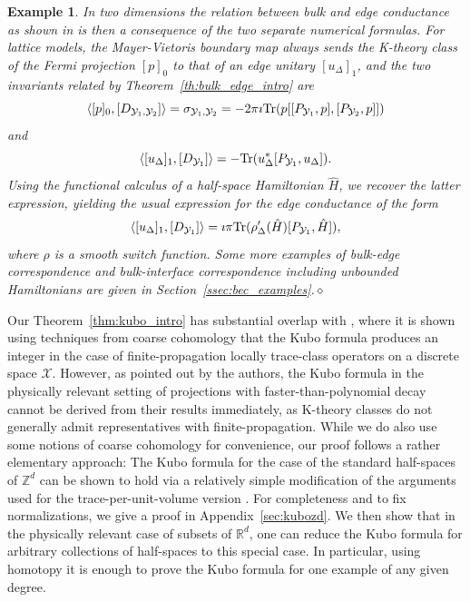 \documentclass[12pt]{amsart}
\newtheorem{example}[theorem]{Example}
\newcommand{\RM}{{\mathbb R}}
\newcommand{\ZM}{{\mathbb Z}}
\newcommand{\Xx}{{\mathcal X}}
\newcommand{\Yy}{{\mathcal Y}}
\newcommand{\Tr}{\mbox{\rm Tr}}
\begin{document}
\begin{example}
{\rm In two dimensions the relation between bulk and edge conductance as shown in \cite{drouot2024bulk} is then a consequence of the two separate numerical formulas. For lattice models, the Mayer-Vietoris boundary map always sends the K-theory class of the Fermi projection $[p]_0$ to that of an edge unitary $[u_\Delta]_1$, and the two invariants related by Theorem~\ref{th:bulk_edge_intro} are
$$\langle [p]_0, [D_{\Yy_1,\Yy_2}] \rangle = \sigma_{\Yy_1,\Yy_2} = -2\pi \imath \Tr(p[[P_{\Yy_1},p],[P_{\Yy_2},p]])$$
and
$$\langle [u_\Delta]_1, [D_{\Yy_1}] \rangle = -\Tr(u_\Delta^* [P_{\Yy_1}, u_\Delta]).$$
Using the functional calculus of a half-space Hamiltonian $\hat{H}$, we recover the latter expression, yielding the usual expression for the edge conductance of the form \cite[Section 6]{LudewigThiang20}
$$\langle [u_\Delta]_1, [D_{\Yy_1}] \rangle = \imath \pi \Tr(\rho'_\Delta(\hat{H}) [P_{\Yy_1}, \hat{H}]),$$
where $\rho$ is a smooth switch function.
Some more examples of bulk-edge correspondence and bulk-interface correspondence including unbounded Hamiltonians are given in Section~\ref{ssec:bec_examples}.}$\diamond$
\end{example}


Our Theorem~\ref{thm:kubo_intro} has substantial overlap with  \cite{LudewigThiang25}, where it is shown using techniques from coarse cohomology that the Kubo formula produces an integer in the case of finite-propagation locally trace-class operators on a discrete space $\Xx$. However, as pointed out by the authors, the Kubo formula in the physically relevant setting of projections with faster-than-polynomial decay cannot be derived from their results immediately, as K-theory classes do not generally admit representatives with finite-propagation. While we do also use some notions of coarse cohomology for convenience, our proof follows a rather elementary approach: The Kubo formula  for the case of the standard half-spaces of $\ZM^d$ can be shown to hold via a relatively simple modification of the arguments used for the trace-per-unit-volume version \cite{Kubota17}. For completeness and to fix normalizations, we give a proof in Appendix~\ref{sec:kubozd}. We then show that in the physically relevant case of subsets of $\RM^d$, one can reduce the Kubo formula for arbitrary collections of half-spaces to this special case. In particular, using homotopy it is enough to prove the Kubo formula for one example of any given degree. 
\end{document}
